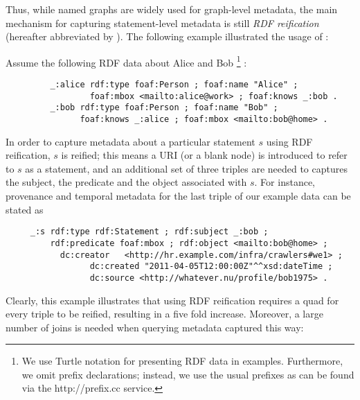 Thus, while named graphs are widely used for graph-level metadata, the main mechanism for capturing statement-level metadata is still \emph{RDF reification}~\cite{Klyne04:RDFconcepts,Hayes04:RDFsemantics} (hereafter abbreviated by \emph{\Reifi}). The following example illustrated the usage of {\Reifi}:

\begin{example}
Assume the following RDF data about Alice and Bob%
\footnote{We use Turtle notation for presenting RDF data in examples. Furthermore, we omit prefix declarations; instead, we use the usual prefixes as can be found via the http://prefix.cc service.}%
:
	\begin{footnotesize}%
	\begin{verbatim}
		 _:alice rdf:type foaf:Person ; foaf:name "Alice" ; 
		         foaf:mbox <mailto:alice@work> ; foaf:knows _:bob .
		 _:bob rdf:type foaf:Person ; foaf:name "Bob" ;
		       foaf:knows _:alice ; foaf:mbox <mailto:bob@home> .
	\end{verbatim}%
	\end{footnotesize}


\noindent
In order to capture metadata about a particular statement $s$ using RDF reification, $s$ is reified; this means a URI (or a blank node) is introduced to refer to $s$ as a statement, and an additional set of three triples are needed to captures the subject, the predicate and the object associated with $s$. For instance, provenance and temporal metadata for the last triple of our example data can be stated as 
  \begin{footnotesize}%
	\begin{verbatim}
	 _:s rdf:type rdf:Statement ; rdf:subject _:bob ; 
	     rdf:predicate foaf:mbox ; rdf:object <mailto:bob@home> ; 
	 	   dc:creator	<http://hr.example.com/infra/crawlers#we1> ;
			     dc:created "2011-04-05T12:00:00Z"^^xsd:dateTime ; 
			     dc:source <http://whatever.nu/profile/bob1975> .
	\end{verbatim}%
	\end{footnotesize}
\end{example}



Clearly, this example illustrates that using RDF reification requires a
quad for every triple to be reified, resulting in a five fold increase. Moreover, a large number of joins is needed when querying metadata captured this way:  



